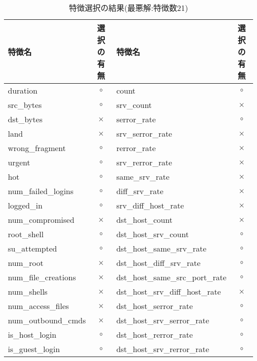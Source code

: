 \begin{table}[htbp]
  \setlength{\tabcolsep}{2pt} %
  \renewcommand{\arraystretch}{0.8} %
  \centering
  \caption{特徴選択の結果(最悪解:特徴数21)}
  \begin{tabular}{|l|c|l|c|}
      \hline
      特徴名 & 選択の有無 & 特徴名 & 選択の有無   \\
      \hline
      duration & \(\circ\) & count & \(\circ\)  \\
      \hline
      src\_bytes & \(\circ\) & srv\_count & \(\times\)   \\
      \hline
      dst\_bytes & \(\times\) & serror\_rate & \(\circ\)   \\
      \cline{1-4}
      land & \(\times\) & srv\_serror\_rate & \(\times\)   \\
      \cline{1-4}
      wrong\_fragment & \(\circ\) & rerror\_rate & \(\times\)   \\
      \cline{1-4}
      urgent & \(\circ\) & srv\_rerror\_rate & \(\times\)   \\
      \cline{1-4}
      hot & \(\circ\) & same\_srv\_rate & \(\times\)   \\
      \cline{1-4}
      num\_failed\_logins & \(\circ\) & diff\_srv\_rate &  \(\times\)  \\
      \cline{1-4}
      logged\_in & \(\circ\) & srv\_diff\_host\_rate &  \(\times\)   \\
      \cline{1-4}
      num\_compromised & \(\times\) & dst\_host\_count & \(\times\)   \\
      \cline{1-4}
      root\_shell & \(\circ\) & dst\_host\_srv\_count &\(\circ\)   \\
      \cline{1-4}
      su\_attempted & \(\circ\) & dst\_host\_same\_srv\_rate & \(\circ\)   \\
      \cline{1-4}
      num\_root & \(\times\) & dst\_host\_diff\_srv\_rate &  \(\circ\)  \\
      \cline{1-4}
      num\_file\_creations &  \(\times\) & dst\_host\_same\_src\_port\_rate &  \(\circ\)   \\
      \cline{1-4}
      num\_shells &  \(\times\) & dst\_host\_srv\_diff\_host\_rate & \(\times\)   \\
      \cline{1-4}
      num\_access\_files &  \(\times\) & dst\_host\_serror\_rate & \(\circ\)   \\
      \cline{1-4}
      num\_outbound\_cmds & \(\times\) & dst\_host\_srv\_serror\_rate & \(\circ\)   \\
      \cline{1-4}
      is\_host\_login & \(\circ\) &  dst\_host\_rerror\_rate & \(\circ\)   \\
      \cline{1-4}
      is\_guest\_login & \(\circ\) & dst\_host\_srv\_rerror\_rate & \(\circ\)  \\
      \cline{1-4}
  \end{tabular}
\end{table}


